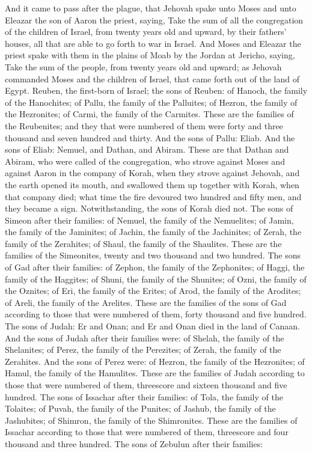 And it came to pass after the plague, that Jehovah spake unto Moses and unto Eleazar the son of Aaron the priest, saying, Take the sum of all the congregation of the children of Israel, from twenty years old and upward, by their fathers’ houses, all that are able to go forth to war in Israel. And Moses and Eleazar the priest spake with them in the plains of Moab by the Jordan at Jericho, saying, Take the sum of the people, from twenty years old and upward; as Jehovah commanded Moses and the children of Israel, that came forth out of the land of Egypt.  Reuben, the first-born of Israel; the sons of Reuben: of Hanoch, the family of the Hanochites; of Pallu, the family of the Palluites; of Hezron, the family of the Hezronites; of Carmi, the family of the Carmites. These are the families of the Reubenites; and they that were numbered of them were forty and three thousand and seven hundred and thirty. And the sons of Pallu: Eliab. And the sons of Eliab: Nemuel, and Dathan, and Abiram. These are that Dathan and Abiram, who were called of the congregation, who strove against Moses and against Aaron in the company of Korah, when they strove against Jehovah, and the earth opened its mouth, and swallowed them up together with Korah, when that company died; what time the fire devoured two hundred and fifty men, and they became a sign. Notwithstanding, the sons of Korah died not.  The sons of Simeon after their families: of Nemuel, the family of the Nemuelites; of Jamin, the family of the Jaminites; of Jachin, the family of the Jachinites; of Zerah, the family of the Zerahites; of Shaul, the family of the Shaulites. These are the families of the Simeonites, twenty and two thousand and two hundred.  The sons of Gad after their families: of Zephon, the family of the Zephonites; of Haggi, the family of the Haggites; of Shuni, the family of the Shunites; of Ozni, the family of the Oznites; of Eri, the family of the Erites; of Arod, the family of the Arodites; of Areli, the family of the Arelites. These are the families of the sons of Gad according to those that were numbered of them, forty thousand and five hundred.  The sons of Judah: Er and Onan; and Er and Onan died in the land of Canaan. And the sons of Judah after their families were: of Shelah, the family of the Shelanites; of Perez, the family of the Perezites; of Zerah, the family of the Zerahites. And the sons of Perez were: of Hezron, the family of the Hezronites; of Hamul, the family of the Hamulites. These are the families of Judah according to those that were numbered of them, threescore and sixteen thousand and five hundred.  The sons of Issachar after their families: of Tola, the family of the Tolaites; of Puvah, the family of the Punites; of Jashub, the family of the Jashubites; of Shimron, the family of the Shimronites. These are the families of Issachar according to those that were numbered of them, threescore and four thousand and three hundred.  The sons of Zebulun after their families: 